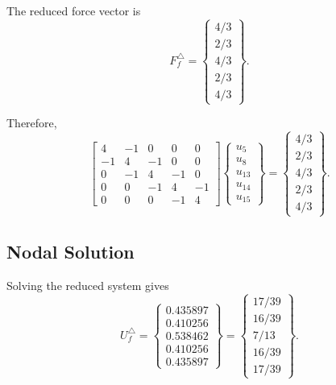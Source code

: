 \documentclass[14pt,a4paper]{article}
\newcommand{\vect}[1]{\begin{Bmatrix}#1\end{Bmatrix}}
\newcommand{\mat}[1]{\begin{bmatrix}#1\end{bmatrix}}
\begin{document}
The reduced force vector is
\begin{equation}
F_f^{\triangle}=
\vect{
4/3\\
2/3\\
4/3\\
2/3\\
4/3
}.
\end{equation}

Therefore,
\begin{equation}
\mat{
4 & -1 & 0 & 0 & 0\\
-1 & 4 & -1 & 0 & 0\\
0 & -1 & 4 & -1 & 0\\
0 & 0 & -1 & 4 & -1\\
0 & 0 & 0 & -1 & 4
}
\vect{u_5\\u_8\\u_{13}\\u_{14}\\u_{15}}
=
\vect{4/3\\2/3\\4/3\\2/3\\4/3}.
\end{equation}

\subsection{Nodal Solution}

Solving the reduced system gives
\begin{equation}
U_f^{\triangle}=\vect{
0.435897\\
0.410256\\
0.538462\\
0.410256\\
0.435897
}
=
\vect{
17/39\\
16/39\\
7/13\\
16/39\\
17/39
}.
\end{equation}
\end{document}
